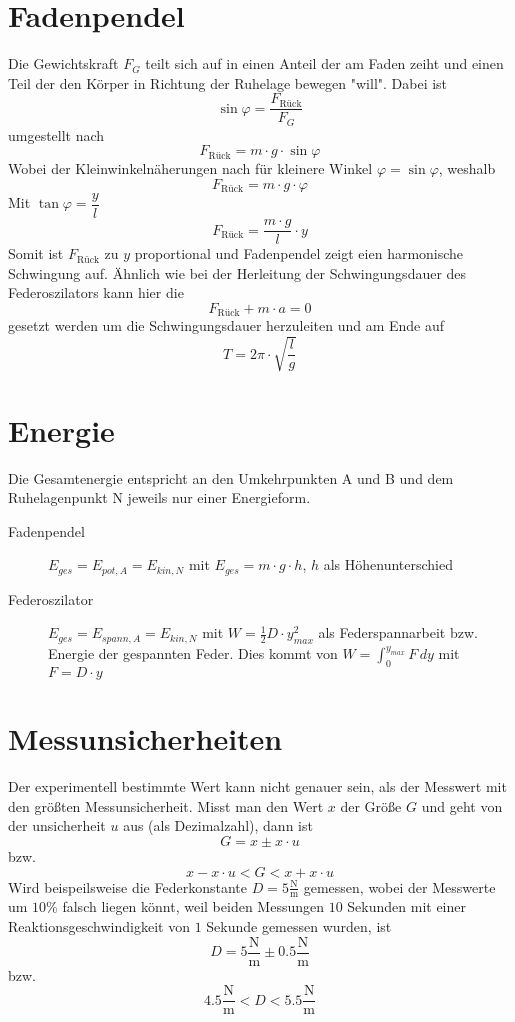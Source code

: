 \documentclass{article}
\begin{document}
\section{Fadenpendel}
\setcounter{equation}{0} 
Die Gewichtskraft $F_G$ teilt sich auf in einen Anteil der am Faden zeiht und einen Teil der den Körper in Richtung der Ruhelage bewegen "will". \newline
Dabei ist
\begin{equation}
 \sin \varphi = \frac{F_{\text{Rück}}}{F_G}
\end{equation} 
umgestellt nach
\begin{equation}
 F_{\text{Rück}} = m \cdot g \cdot \sin{\varphi}
\end{equation}  
Wobei der Kleinwinkelnäherungen nach für kleinere Winkel $\varphi = \sin{\varphi}$, weshalb 
\begin{equation} 
 F_{\text{Rück}} = m \cdot g \cdot \varphi
\end{equation}  
Mit $\tan \varphi = \dfrac{y}{l}$ 
\begin{equation} 
 F_{\text{Rück}} = \frac{m \cdot g}{l} \cdot y
\end{equation}
Somit ist $F_{\text{Rück}}$ zu $y$ proportional und Fadenpendel zeigt eien harmonische Schwingung auf. Ähnlich wie bei der Herleitung der Schwingungsdauer des Federoszilators kann hier die
\[
 F_{\text{Rück}} + m \cdot a = 0
\]
gesetzt werden um die Schwingungsdauer herzuleiten und am Ende auf
\[
 T = 2\pi \cdot \sqrt{\frac{l}{g}} 
\] 
 
\section{Energie}
Die Gesamtenergie entspricht an den Umkehrpunkten A und B und dem Ruhelagenpunkt N jeweils nur einer Energieform.
 
\begin{description}
 \item[Fadenpendel] $E_{ges} = E_{pot,A} = E_{kin,N}$ mit $E_{ges} = m \cdot g \cdot h$, $h$ als Höhenunterschied
 \item[Federoszilator] $E_{ges} = E_{spann,A} = E_{kin,N}$ mit
$W=\frac{1}{2}D \cdot y_{max}^2$ als Federspannarbeit bzw. Energie der gespannten Feder.
Dies kommt von $W = \int_0^{y_{max}} F \,dy$ mit $F=D \cdot y$ 
\end{description} 
 
\section{Messunsicherheiten}
Der experimentell bestimmte Wert kann nicht genauer sein, als der Messwert mit den größten Messunsicherheit. Misst man den Wert $x$ der Größe $G$ und geht von der unsicherheit $u$ aus (als Dezimalzahl), dann ist
\[
 G = x \pm x \cdot u
\]
bzw. 
\[
 x - x \cdot u < G < x + x \cdot u
\]
Wird beispeilsweise die Federkonstante $D=5 \frac{\si{\newton}}{\si{\meter}}$ gemessen, wobei der Messwerte um $10\%$ falsch liegen könnt, weil beiden Messungen $10$ Sekunden mit einer Reaktionsgeschwindigkeit von $1$ Sekunde gemessen wurden, ist
\[
 D = 5 \frac{\si{\newton}}{\si{\meter}} \pm 0.5 \frac{\si{\newton}}{\si{\meter}}
\] 
bzw.
\[
 4.5 \frac{\si{\newton}}{\si{\meter}} < D < 5.5 \frac{\si{\newton}}{\si{\meter}}
\] 
 
\end{document}
